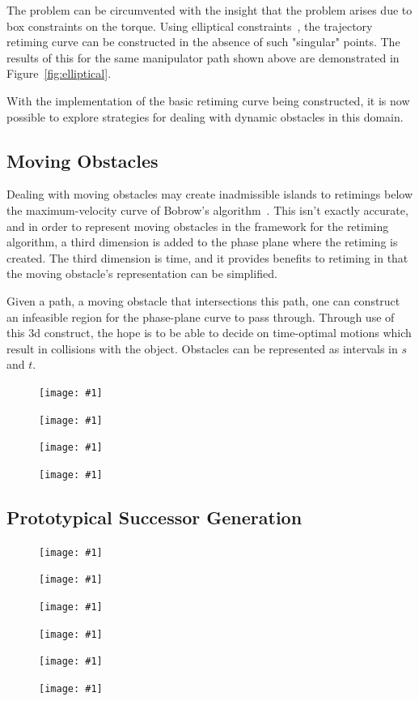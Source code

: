 \documentclass[letterpaper,10pt]{article} %
\newcommand{\ffig}[3]{
\begin{figure}[h!]
\centering
\texttt{[image: \#1]}
\caption{#2}
\label{fig:#3}
\end{figure}
}
\begin{document}
The problem can be circumvented with the insight that the problem arises due to box constraints on the torque. Using elliptical constraints~\cite{shiller1992computation}, the trajectory retiming curve can be constructed in the absence of such "singular" points. The results of this for the same manipulator path shown above are demonstrated in Figure~\ref{fig:elliptical}.

With the implementation of the basic retiming curve being constructed, it is now possible to explore strategies for dealing with dynamic obstacles in this domain.

\subsection{Moving Obstacles}\label{subsec:obs}

Dealing with moving obstacles may create inadmissible islands to retimings below the maximum-velocity curve of Bobrow's algorithm~\cite{shin1985minimum}. This isn't exactly accurate, and in order to represent moving obstacles in the framework for the retiming algorithm, a third dimension is added to the phase plane where the retiming is created. The third dimension is time, and it provides benefits to retiming in that the moving obstacle's representation can be simplified.

Given a path, a moving obstacle that intersections this path, one can construct an infeasible region for the phase-plane curve to pass through. Through use of this 3d construct, the hope is to be able to decide on time-optimal motions which result in collisions with the object. Obstacles can be represented as intervals in $s$ and $t$.

\ffig{pics/representation3d1}{}{rep3d1}
\ffig{pics/representation3d2}{}{rep3d2}
\ffig{pics/representation3d3}{}{rep3d3}
\ffig{pics/representation3d4}{}{rep3d4}

\subsection{Prototypical Successor Generation}\label{subsec:succ}

\ffig{pics/planner/initial_exp1}{}{iexp1}
\ffig{pics/planner/initial_exp2}{}{iexp2}
\ffig{pics/planner/second_exp1}{}{sexp1}
\ffig{pics/planner/second_exp2}{}{sexp2}
\ffig{pics/planner/second_exp5}{}{sexp5}
\ffig{pics/planner/second_exp4}{}{sexp4}







\end{document}
